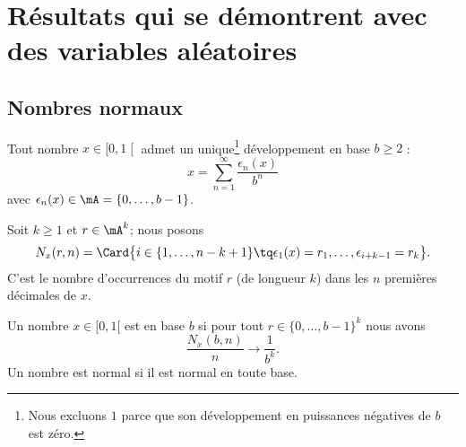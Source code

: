
\section{Résultats qui se démontrent avec des variables aléatoires}

\subsection{Nombres normaux}

Tout nombre \( x\in \mathopen[ 0 , 1 \mathclose[\) admet un unique\footnote{Nous excluons \( 1\) parce que son développement en puissances négatives de \( b\) est zéro.} développement en base \( b\geq 2\) :
\begin{equation}
	x=\sum_{n=1}^{\infty}\frac{ \epsilon_n(x) }{ b^n }
\end{equation}
avec \( \epsilon_n(x)\in\mA=\{ 0,\ldots, b-1 \}\).

Soit \( k\geq 1\) et \( r\in \mA^k\); nous posons
\begin{equation}
	N_x(r,n)=\Card\big\{   i\in\{ 1,\ldots, n-k+1 \}\tq \epsilon_1(x)=r_1,\ldots, \epsilon_{i+k-1}=r_k \big\}.
\end{equation}
C'est le nombre d'occurrences du motif \( r\) (de longueur \( k\)) dans les \( n\) premières décimales de \( x\).

\begin{definition}
	Un nombre \( x\in\mathopen[ 0 , 1 [\) est  en base \( b\) si pour tout \( r\in\{ 0,\ldots, b-1 \}^k\) nous avons
	\begin{equation}
		\frac{ N_x(b,n) }{ n }\to \frac{1}{ b^k }.
	\end{equation}
	Un nombre est normal si il est normal en toute base.
\end{definition}

